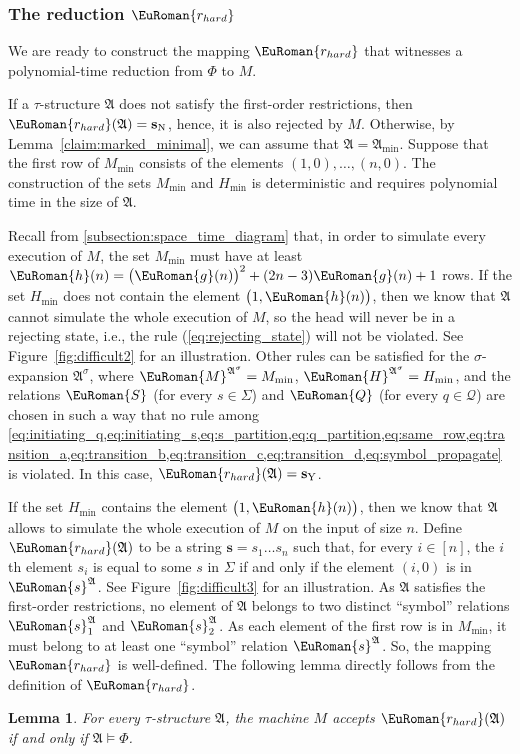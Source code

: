 \documentclass[10pt,a4paper]{amsart}
\theoremstyle{plain}
\newtheorem{lem}[thm]{Lemma}
\theoremstyle{definition}
\numberwithin{equation}{section}
\newcommand{\eurm}[1]{\EuRoman{#1}} %
\newcommand{\euca}[1]{\mathcal{#1}} %
\newcommand{\ie}{i.e.\xspace}  %
\newcommand{\structure}[1]{\mathfrak{#1}} %
\newcommand{\tuple}[1]{\mathbf{#1}} %
\newcommand{\rel}[1]{\eurm{#1}} %
\newcommand{\family}[1]{\euca{#1}} %
\newcommand{\func}[1]{\eurm{#1}}  %
\begin{document}
\subsubsection*{The reduction $\func{r_{hard}}$}
We are ready to construct the mapping $\func{r_{hard}}$ that witnesses a polynomial-time reduction from $\Phi$ to $M$.

If a $\tau$-structure $\structure{A}$ does not satisfy the first-order restrictions, then $\func{r_{hard}}(\structure{A})=\tuple{s}_{\mathrm{N}}$, hence, it is also rejected by $M$.
Otherwise, by Lemma~\ref{claim:marked_minimal}, we can assume that $\structure{A} = \structure{A}_{\min}$.
Suppose that the first row of $M_{\min}$ consists of the elements $(1,0),\ldots,(n,0)$.
The construction of the sets $M_{\min}$ and $H_{\min}$ is deterministic and requires polynomial time in the size of $\structure{A}$.

Recall from \cref{subsection:space_time_diagram} that, in order to simulate every execution of $M$, the set $M_{\min}$ must have at least $\func{h}(n) = \bigl(\func{g}(n)\bigr)^2 + (2n-3)\func{g}(n) + 1$ rows.
If the set $H_{\min}$ does not contain the element $\bigl(1,\func{h}(n)\bigr)$, then we know that $\structure{A}$ cannot simulate the whole execution of $M$, so the head will never be in a rejecting state, \ie, the rule (\ref{eq:rejecting_state}) will not be violated.
See Figure~\ref{fig:difficult2} for an illustration.
Other rules can be satisfied for the $\sigma$-expansion $\structure{A}^\sigma$, where $\rel{M}^{\structure{A}^\sigma} = M_{\min}$, $\rel{H}^{\structure{A}^\sigma}=H_{\min}$, and the relations $\rel{S}$ (for every $s\in\Sigma$) and $\rel{Q}$ (for every $q\in\family{Q}$) are chosen in such a way that no rule among \cref{eq:initiating_q,eq:initiating_s,eq:s_partition,eq:q_partition,eq:same_row,eq:transition_a,eq:transition_b,eq:transition_c,eq:transition_d,eq:symbol_propagate} is violated.
In this case, $\func{r_{hard}}(\structure{A}) = \tuple{s}_{\mathrm{Y}}$.


If the set $H_{\min}$ contains the element $\bigl(1,\func{h}(n)\bigr)$, then we know that $\structure{A}$ allows to simulate the whole execution of $M$ on the input of size $n$.
Define $\func{r_{hard}}(\structure{A})$ to be a string $\tuple{s}=s_1\ldots s_n$ such that, for every $i\in[n]$, the $i$th element $s_i$ is equal to some $s$ in $\Sigma$ if and only if the element $(i,0)$ is in $\rel{s}^\structure{A}$.
See Figure~\ref{fig:difficult3} for an illustration.
As $\structure{A}$ satisfies the first-order restrictions, no element of $\structure{A}$ belongs to two distinct ``symbol'' relations $\rel{s}_1^\structure{A}$ and $\rel{s}_2^\structure{A}$.
As each element of the first row is in $M_{\min}$, it must belong to at least one ``symbol'' relation $\rel{s}^\structure{A}$.
So, the mapping $\func{r_{hard}}$ is well-defined.
The following lemma directly follows from the definition of $\func{r_{hard}}$.
\begin{lem}\label{lemma:mmsnpineq_reduces_to_np} 
For every $\tau$-structure $\structure{A}$, the machine $M$ accepts $\func{r_{hard}}(\structure{A})$ if and only if $\structure{A}\models\Phi$.
\end{lem}
\end{document}
